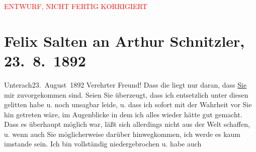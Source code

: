 
\begin{center}
            \textcolor{red}{ENTWURF, NICHT FERTIG KORRIGIERT}
                      \end{center}
            
         
         \renewcommand{\erwaehntePersonen}{Personen: Richard Beer-Hofmann, Hugo von Hofmannsthal}
         \renewcommand{\erwaehnteOrte}{Orte: Bahnhof, Unterach am Attersee, Wien}
         \renewcommand{\erwaehnteWerke}{}
               \section[Felix Salten an Arthur Schnitzler, 23. 8. 1892]{ Felix Salten an Arthur Schnitzler, 23. 8. 1892}\nopagebreak{}\rehead{ }\begin{ledgroupsized}[t]{13cm}\normalsize\beginnumbering \toendnotes[C]{\smallbreak\pagebreak[2]} 
\toendnotes[C]{\smallbreak}\pstart
           \raggedleft{}{\pb}Unterach23. August 1892\pend
           \pstart
           Verehrter Freund! Dass die \label{K_L03113-1v}\label{K_L03113-1h} liegt nur daran, dass \uline{Sie} mir zuvorgekommen
               sind. Seien Sie überzeugt, dass ich entsetzlich unter diesen \label{K_L03113-2v}\label{K_L03113-2h} gelitten habe u. noch unsagbar leide, u. dass ich sofort mit der Wahrheit vor
               Sie hin getreten wäre, im Augenblicke in dem ich alles wieder hätte gut gemacht. Dass
               es überhaupt möglich war, läßt sich allerdings nicht aus der Welt schaffen, u. wenn
               auch Sie möglicher{\pb}weise darüber hinwegkommen, ich werde
               es kaum imstande sein. Ich bin vollständig niedergebrochen u. habe auch

\end{ledgroupsized}
